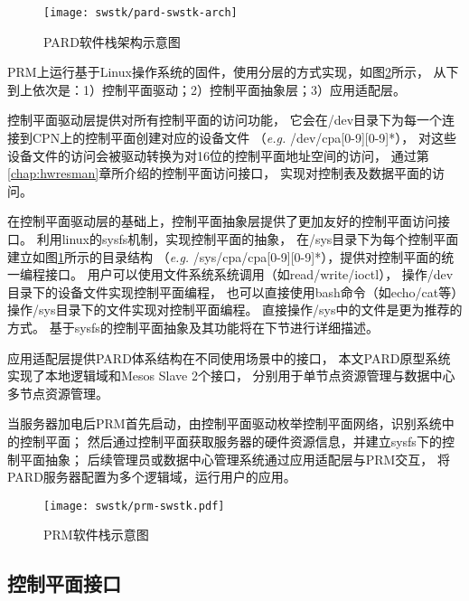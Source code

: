 \begin{figure}[tb]
  \centering
  \texttt{[image: swstk/pard-swstk-arch]}
  \caption{PARD软件栈架构示意图}
  \label{fig:pard-swstk-arch}
\end{figure}


PRM上运行基于Linux操作系统的固件，使用分层的方式实现，如图\ref{fig:prm-swstk}所示，
从下到上依次是：1）控制平面驱动；2）控制平面抽象层；3）应用适配层。

控制平面驱动层提供对所有控制平面的访问功能，
它会在/dev目录下为每一个连接到CPN上的控制平面创建对应的设备文件
（\textit{e.g.} /dev/cpa[0-9][0-9]*），
对这些设备文件的访问会被驱动转换为对16位的控制平面地址空间的访问，
通过第\ref{chap:hwresman}章所介绍的控制平面访问接口，
实现对控制表及数据平面的访问。

在控制平面驱动层的基础上，控制平面抽象层提供了更加友好的控制平面访问接口。
利用linux的sysfs\cite{patrick_mochel_sysfs_2005}机制，实现控制平面的抽象，
在/sys目录下为每个控制平面建立如图\ref{fig:pard-swstk-arch}所示的目录结构
（\textit{e.g.} /sys/cpa/cpa[0-9][0-9]*），提供对控制平面的统一编程接口。
用户可以使用文件系统系统调用（如read/write/ioctl），
操作/dev目录下的设备文件实现控制平面编程，
也可以直接使用bash命令（如echo/cat等）操作/sys目录下的文件实现对控制平面编程。
直接操作/sys中的文件是更为推荐的方式。
基于sysfs的控制平面抽象及其功能将在下节进行详细描述。

应用适配层提供PARD体系结构在不同使用场景中的接口，
本文PARD原型系统实现了本地逻辑域和Mesos Slave 2个接口，
分别用于单节点资源管理与数据中心多节点资源管理。

当服务器加电后PRM首先启动，由控制平面驱动枚举控制平面网络，识别系统中的控制平面；
然后通过控制平面获取服务器的硬件资源信息，并建立sysfs下的控制平面抽象；
后续管理员或数据中心管理系统通过应用适配层与PRM交互，
将PARD服务器配置为多个逻辑域，运行用户的应用。


\begin{figure}[tb]
  \centering
  \texttt{[image: swstk/prm-swstk.pdf]}
  \caption[PRM软件栈示意图]{PRM软件栈示意图}
  \label{fig:prm-swstk}
\end{figure}


\subsection{控制平面接口}
\label{chap:prm:arch:cpabs}

